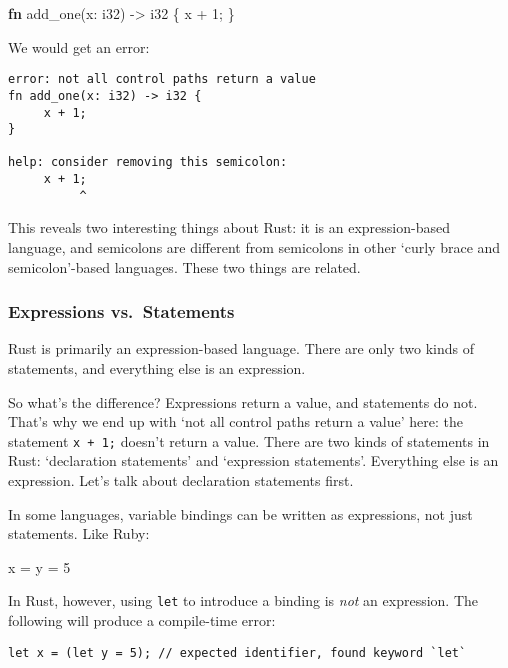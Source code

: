 \documentclass[a4paper,]{book}
\newenvironment{Shaded}{\begin{snugshade}}{\end{snugshade}}
\newcommand{\KeywordTok}[1]{\textcolor[rgb]{0.13,0.29,0.53}{\textbf{{#1}}}}
\newcommand{\DataTypeTok}[1]{\textcolor[rgb]{0.13,0.29,0.53}{{#1}}}
\newcommand{\DecValTok}[1]{\textcolor[rgb]{0.00,0.00,0.81}{{#1}}}
\newcommand{\NormalTok}[1]{{#1}}
\begin{document}
\begin{Shaded}
\begin{Highlighting}[]
\KeywordTok{fn} \NormalTok{add_one(x: }\DataTypeTok{i32}\NormalTok{) -> }\DataTypeTok{i32} \NormalTok{\{}
    \NormalTok{x + }\DecValTok{1}\NormalTok{;}
\NormalTok{\}}
\end{Highlighting}
\end{Shaded}

We would get an error:

\begin{verbatim}
error: not all control paths return a value
fn add_one(x: i32) -> i32 {
     x + 1;
}

help: consider removing this semicolon:
     x + 1;
          ^
\end{verbatim}

This reveals two interesting things about Rust: it is an
expression-based language, and semicolons are different from semicolons
in other `curly brace and semicolon'-based languages. These two things
are related.

\subsubsection{Expressions
vs.~Statements}\label{expressions-vs.statements}

Rust is primarily an expression-based language. There are only two kinds
of statements, and everything else is an expression.

So what's the difference? Expressions return a value, and statements do
not. That's why we end up with `not all control paths return a value'
here: the statement \texttt{x\ +\ 1;} doesn't return a value. There are
two kinds of statements in Rust: `declaration statements' and
`expression statements'. Everything else is an expression. Let's talk
about declaration statements first.

In some languages, variable bindings can be written as expressions, not
just statements. Like Ruby:

\begin{Shaded}
\begin{Highlighting}[]
\NormalTok{x = y = }\DecValTok{5}
\end{Highlighting}
\end{Shaded}

In Rust, however, using \texttt{let} to introduce a binding is
\emph{not} an expression. The following will produce a compile-time
error:

\begin{verbatim}
let x = (let y = 5); // expected identifier, found keyword `let`
\end{verbatim}
\end{document}
